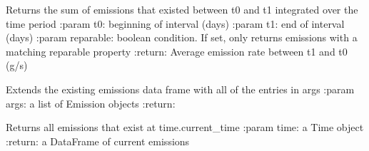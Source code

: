 \documentclass[letterpaper,10pt,english]{sphinxmanual}
\begin{document}
\begin{fulllineitems}
\begin{quote}
\begin{description}
\begin{itemize}
\end{itemize}

\end{description}\end{quote}

\begin{fulllineitems}
\label{\detokenize{index:feast.EmissionSimModules.emission_class_functions.Emission.em_rate_in_range}}
Returns the sum of emissions that existed between t0 and t1 integrated over the time period
:param t0: beginning of interval (days)
:param t1: end of interval (days)
:param reparable: boolean condition. If set, only returns emissions with a matching reparable property
:return: Average emission rate between t1 and t0 (g/s)

\end{fulllineitems}


\begin{fulllineitems}
\label{\detokenize{index:feast.EmissionSimModules.emission_class_functions.Emission.extend}}
Extends the existing emissions data frame with all of the entries in args
:param args: a list of Emission objects
:return:

\end{fulllineitems}


\begin{fulllineitems}
\label{\detokenize{index:feast.EmissionSimModules.emission_class_functions.Emission.get_current_emissions}}
Returns all emissions that exist at time.current\_time
:param time: a Time object
:return: a DataFrame of current emissions

\end{fulllineitems}



\end{fulllineitems}
\end{document}
